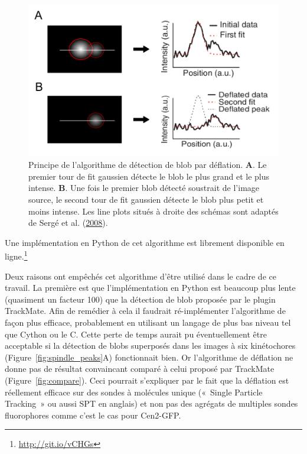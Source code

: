 \documentclass[12pt,a4paper,twoside,openright]{book}
\begin{document}
\begin{figure}[htbp]
\centering
\includegraphics{figures/results/imaging/deflation.png}
\caption[Principe de l'algorithme de détection de blob par déflation]{\label{fig:deflation}Principe
de l'algorithme de détection de blob par déflation. \textbf{A}. Le
premier tour de fit gaussien détecte le blob le plus grand et le plus
intense. \textbf{B}. Une fois le premier blob détecté soustrait de
l'image source, le second tour de fit gaussien détecte le blob plus
petit et moins intense. Les line plots situés à droite des schémas sont
adaptés de Sergé et al. (\protect\hyperlink{ref-Serge2008}{2008}).}
\end{figure}

Une implémentation en Python de cet algorithme est librement disponible
en ligne.\footnote{\url{http://git.io/vCHGs}}

Deux raisons ont empêchés cet algorithme d'être utilisé dans le cadre de
ce travail. La première est que l'implémentation en Python est beaucoup
plus lente (quasiment un facteur 100) que la détection de blob proposée
par le plugin TrackMate. Afin de remédier à cela il faudrait
ré-implémenter l'algorithme de façon plus efficace, probablement en
utilisant un langage de plus bas niveau tel que Cython ou le C. Cette
perte de temps aurait pu éventuellement être acceptable si la détection
de blobs superposés dans les images à six kinétochores
(Figure~\ref{fig:spindle_peaks}A) fonctionnait bien. Or l'algorithme de
déflation ne donne pas de résultat convaincant comparé à celui proposé
par TrackMate (Figure~\ref{fig:compare}). Ceci pourrait s'expliquer par
le fait que la déflation est réellement efficace sur des sondes à
molécules unique («~Single Particle Tracking~» ou aussi SPT en anglais)
et non pas des agrégats de multiples sondes fluorophores comme c'est le
cas pour Cen2-GFP.
\end{document}
